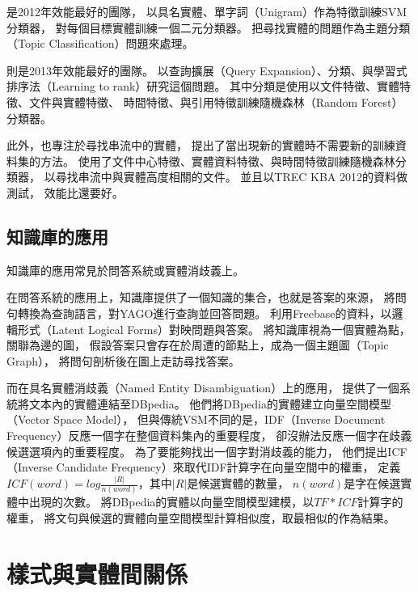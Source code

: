 

\cite{kba-hltoce}是2012年效能最好的團隊，
以具名實體、單字詞（Unigram）作為特徵訓練SVM分類器，
對每個目標實體訓練一個二元分類器。
把尋找實體的問題作為主題分類（Topic Classification）問題來處理。

\cite{kba-msra}則是2013年效能最好的團隊。
以查詢擴展（Query Expansion）、分類、與學習式排序法（Learning to rank）研究這個問題。
其中分類是使用以文件特徵、實體特徵、文件與實體特徵、
時間特徵、與引用特徵訓練隨機森林（Random Forest）分類器。

此外，\cite{kba-entity-detection}也專注於尋找串流中的實體，
提出了當出現新的實體時不需要新的訓練資料集的方法。
使用了文件中心特徵、實體資料特徵、與時間特徵訓練隨機森林分類器，
以尋找串流中與實體高度相關的文件。
並且以TREC KBA 2012的資料做測試，
效能比\cite{kba-hltoce}還要好。

\subsection{知識庫的應用}

知識庫的應用常見於問答系統或實體消歧義上。

在問答系統的應用上，知識庫提供了一個知識的集合，也就是答案的來源，
\cite{yago-qa}將問句轉換為查詢語言，對YAGO進行查詢並回答問題。
\cite{freebase-qa-extract}利用Freebase的資料，以邏輯形式（Latent Logical Forms）對映問題與答案。
\cite{freebase-qa-parse}將知識庫視為一個實體為點，關聯為邊的圖，
假設答案只會存在於周遭的節點上，成為一個主題圖（Topic Graph），
將問句剖析後在圖上走訪尋找答案。

而在具名實體消歧義（Named Entity Disambiguation）上的應用，
\cite{dbpedia-spotlight} 提供了一個系統將文本內的實體連結至DBpedia。
他們將DBpedia的實體建立向量空間模型（Vector Space Model），
但與傳統VSM不同的是，IDF（Inverse Document Frequency）反應一個字在整個資料集內的重要程度，
卻沒辦法反應一個字在歧義候選選項內的重要程度。
為了要能夠找出一個字對消歧義的能力，
他們提出ICF（Inverse Candidate Frequency）來取代IDF計算字在向量空間中的權重，
定義$ICF(word) = log \frac{|R|}{n(word)}$，其中$|R|$是候選實體的數量，
$n(word)$是字在候選實體中出現的次數。
將DBpedia的實體以向量空間模型建模，以$TF*ICF$計算字的權重，
將文句與候選的實體向量空間模型計算相似度，取最相似的作為結果。


%
%
\section{樣式與實體間關係}

